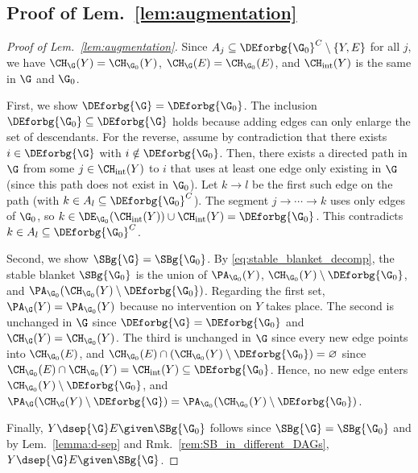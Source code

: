 \subsection{Proof of Lem.~\ref{lem:augmentation}} \label{app:proof_augmentation}
\begin{proof}[Proof of Lem.~\ref{lem:augmentation}]
Since $A_j \subseteq \DEforbg{\G_0}^C \setminus \{Y, E\}$ for all $j$, we have $\CH_{\G}(Y) = \CH_{\G_0}(Y)$, $\CH_{\G}(E) = \CH_{\G_0}(E)$, and $\CH_\mathrm{int}(Y)$ is the same in $\G$ and $\G_0$.

First, we show $\DEforbg{\G} = \DEforbg{\G_0}$. The inclusion $\DEforbg{\G_0} \subseteq \DEforbg{\G}$ holds because adding edges can only enlarge the set of descendants. For the reverse, assume by contradiction that there exists $i \in \DEforbg{\G}$ with $i \notin \DEforbg{\G_0}$. Then, there exists a directed path in $\G$ from some $j \in \CH_\mathrm{int}(Y)$ to $i$ that uses at least one edge only existing in $\G$ (since this path does not exist in $\G_0$). Let $k \to l$ be the first such edge on the path (with $k \in A_l \subseteq \DEforbg{\G_0}^C$). The segment $j \to \cdots \to k$ uses only edges of $\G_0$, so $k \in \DE_{\G_0}(\CH_\mathrm{int}(Y)) \cup \CH_\mathrm{int}(Y) = \DEforbg{\G_0}$. This contradicts $k \in A_l \subseteq \DEforbg{\G_0}^C$.

Second, we show $\SBg{\G} = \SBg{\G_0}$. By \eqref{eq:stable_blanket_decomp}, the stable blanket $\SBg{\G_0}$ is the union of $\PA_{\G_0}(Y)$, $\CH_{\G_0}(Y) \setminus \DEforbg{\G_0}$, and $\PA_{\G_0}(\CH_{\G_0}(Y) \setminus \DEforbg{\G_0})$. Regarding the first set, $\PA_{\G}(Y) = \PA_{\G_0}(Y)$ because no intervention on $Y$ takes place. The second is unchanged in $\G$ since $\DEforbg{\G} = \DEforbg{\G_0}$ and $\CH_{\G}(Y) = \CH_{\G_0}(Y)$. The third is unchanged in $\G$ since every new edge points into $\CH_{\G_0}(E)$, and $\CH_{\G_0}(E) \cap (\CH_{\G_0}(Y) \setminus \DEforbg{\G_0}) = \varnothing$ since $\CH_{\G_0}(E) \cap \CH_{\G_0}(Y) = \CH_\mathrm{int}(Y) \subseteq \DEforbg{\G_0}$. Hence, no new edge enters $\CH_{\G_0}(Y) \setminus \DEforbg{\G_0}$, and $\PA_{\G}(\CH_{\G}(Y) \setminus \DEforbg{\G}) = \PA_{\G_0}(\CH_{\G_0}(Y) \setminus \DEforbg{\G_0})$.

Finally, $Y \dsep{\G} E \given \SBg{\G_0}$ follows since $\SBg{\G} = \SBg{\G_0}$ and by Lem.~\ref{lemma:d-sep} and Rmk.~\ref{rem:SB_in_different_DAGs}, $Y \dsep{\G} E \given \SBg{\G}$.
\end{proof}

